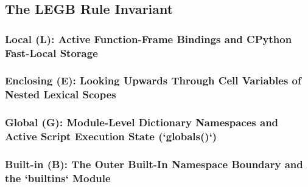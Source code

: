 \subsection{The LEGB Rule Invariant}
\subsubsection{Local (L): Active Function-Frame Bindings and CPython Fast-Local Storage}
\subsubsection{Enclosing (E): Looking Upwards Through Cell Variables of Nested Lexical Scopes}
\subsubsection{Global (G): Module-Level Dictionary Namespaces and Active Script Execution State (`globals()`)}
\subsubsection{Built-in (B): The Outer Built-In Namespace Boundary and the `builtins` Module}
